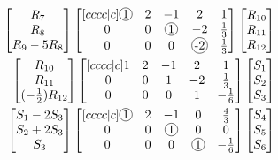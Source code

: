 \documentclass{report}
\theoremstyle{plain}
\theoremstyle{definition}
\theoremstyle{plain}
\newcommand*\circled[1]{\tikz[baseline=(char.base)]{
            \node[shape=circle,draw,inner sep=0.8pt] (char) {#1};}}
\begin{document}
\begin{align*}
\begin{bmatrix}
R_7\\
R_8\\
R_9 - 5R_8\\
\end{bmatrix}
\begin{bmatrix}[cccc|c]
\circled{1} & 2 & -1 & 2 & 1\\
0 & 0 & \circled{1} & -2 & \frac{1}{3}\\
0 & 0 & 0 & \circled{-2} & \frac{1}{3}\\
\end{bmatrix}
\begin{bmatrix}
R_{10}\\ R_{11}\\ R_{12}\\
\end{bmatrix}\\
\begin{bmatrix}
R_{10}\\
R_{11}\\
(-\frac{1}{2})R_{12}\\
\end{bmatrix}
\begin{bmatrix}[cccc|c]
1 & 2 & -1 & 2 & 1\\
0 & 0 & 1 & -2 & \frac{1}{3}\\
0 & 0 & 0 & 1 & -\frac{1}{6}\\
\end{bmatrix}
\begin{bmatrix}
S_1\\ S_2\\ S_3\\
\end{bmatrix}\\
\begin{bmatrix}
S_1 - 2S_3\\
S_2 + 2S_3\\
S_3\\
\end{bmatrix}
\begin{bmatrix}[cccc|c]
\circled{1} & 2 & -1 & 0 & \frac{4}{3}\\
0 & 0 & \circled{1} & 0 & 0\\
0 & 0 & 0 & \circled{1} & -\frac{1}{6}\\
\end{bmatrix}
\begin{bmatrix}
S_4\\ S_5\\ S_6\\

\end{bmatrix}
\end{align*}
\end{document}
